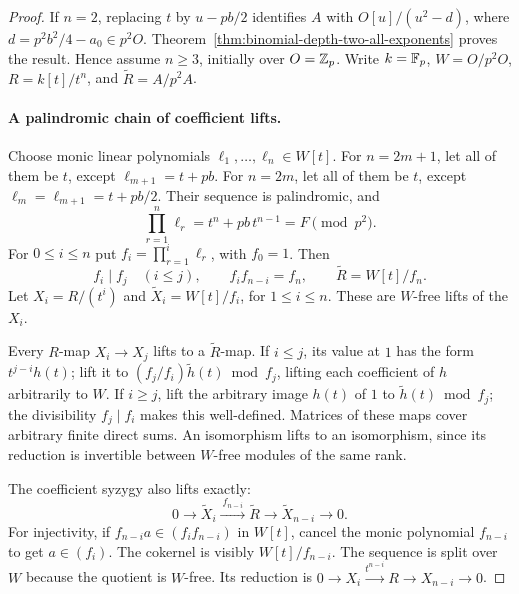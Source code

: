 \begin{proof}
If $n=2$, replacing $t$ by $u-pb/2$ identifies $A$ with
$O[u]/(u^2-d)$, where $d=p^2b^2/4-a_0\in p^2O$.
Theorem~\ref{thm:binomial-depth-two-all-exponents} proves the result.
Hence assume $n\ge3$, initially over $O=\mathbb Z_p$.
Write $k=\mathbb F_p$, $W=O/p^2O$, $R=k[t]/t^n$, and
$\widetilde R=A/p^2A$.

\paragraph{A palindromic chain of coefficient lifts.}
Choose monic linear polynomials $\ell_1,\ldots,\ell_n\in W[t]$.
For $n=2m+1$, let all of them be $t$, except
$\ell_{m+1}=t+pb$.
For $n=2m$, let all of them be $t$, except
$\ell_m=\ell_{m+1}=t+pb/2$.
Their sequence is palindromic, and
\[
 \prod_{r=1}^n\ell_r=t^n+pb\,t^{n-1}=F\pmod{p^2}.
\]
For $0\le i\le n$ put $f_i=\prod_{r=1}^i\ell_r$, with
$f_0=1$.  Then
\begin{equation}\label{eq:shallow-palindrome}
 f_i\mid f_j\quad(i\le j),\qquad
 f_i f_{n-i}=f_n,
 \qquad \widetilde R=W[t]/f_n.
\end{equation}
Let $X_i=R/(t^i)$ and
$\widetilde X_i=W[t]/f_i$, for $1\le i\le n$.
These are $W$-free lifts of the $X_i$.

Every $R$-map $X_i\to X_j$ lifts to a
$\widetilde R$-map.  If $i\le j$, its value at $1$ has the
form $t^{j-i}h(t)$; lift it to
$(f_j/f_i)\widetilde h(t)\bmod f_j$, lifting each coefficient
of $h$ arbitrarily to $W$.
If $i\ge j$, lift the arbitrary image $h(t)$ of $1$ to
$\widetilde h(t)\bmod f_j$; the divisibility $f_j\mid f_i$
makes this well-defined.
Matrices of these maps cover arbitrary finite direct sums.
An isomorphism lifts to an isomorphism, since its reduction
is invertible between $W$-free modules of the same rank.

The coefficient syzygy also lifts exactly:
\begin{equation}\label{eq:shallow-lifted-syzygy}
 0\longrightarrow\widetilde X_i
 \xrightarrow{\ f_{n-i}\ }\widetilde R
 \longrightarrow\widetilde X_{n-i}\longrightarrow0.
\end{equation}
For injectivity, if $f_{n-i}a\in(f_i f_{n-i})$ in $W[t]$,
cancel the monic polynomial $f_{n-i}$ to get $a\in(f_i)$.
The cokernel is visibly $W[t]/f_{n-i}$.
The sequence is split over $W$ because the quotient is
$W$-free.  Its reduction is
$0\to X_i\xrightarrow{t^{n-i}}R\to X_{n-i}\to0$.


\end{proof}
